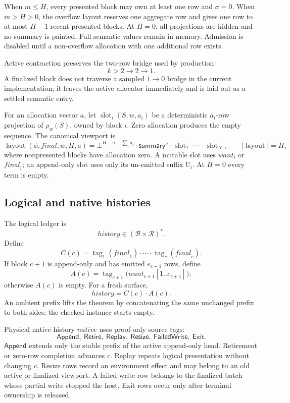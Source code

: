 \documentclass[11pt]{article}
\theoremstyle{definition}
\newcommand{\Rows}{\mathcal{R}}
\newcommand{\Blocks}{\mathcal{B}}
\newcommand{\seq}[1]{#1^{*}}
\newcommand{\len}[1]{\lvert #1\rvert}
\newcommand{\cat}{\mathbin{\cdot}}
\newcommand{\History}{\mathit{history}}
\newcommand{\Native}{\mathit{native}}
\newcommand{\Want}{\mathit{want}}
\newcommand{\Final}{\mathit{final}}
\newcommand{\blank}{\bot}
\begin{document}
When $m\leq H$, every presented block may own at least one row and $\sigma=0$.
When $m>H>0$, the overflow layout reserves one aggregate row and gives one row
to at most $H-1$ recent presented blocks.  At $H=0$, all projections are
hidden and no summary is painted.  Full semantic values remain in memory.
Admission is disabled until a non-overflow allocation with one additional row
exists.

Active contraction preserves the two-row bridge used by production:
\[
  k>2\longrightarrow2\longrightarrow1.
\]
A finalized block does not traverse a sampled $1\to0$ bridge in the current
implementation; it leaves the active allocator immediately and is laid out as
a settled semantic entry.

For an allocation vector $a$, let
$\operatorname{slot}_i(S,w,a_i)$ be a deterministic $a_i$-row projection of
$\rho_w(S)$, owned by block $i$.  Zero allocation produces the empty
sequence.  The canonical viewport is
\[
  \operatorname{layout}(\phi,\Final,w,H,a)
  =\blank^{H-\sigma-\sum_i a_i}
   \cat\mathsf{summary}^{\sigma}
   \cat\operatorname{slot}_1\cat\cdots\cat\operatorname{slot}_N,
  \qquad \len{\operatorname{layout}}=H,
\]
where nonpresented blocks have allocation zero.  A mutable slot uses $\Want_i$
or $\Final_i$; an append-only slot uses only its un-emitted suffix $U_i$.  At $H=0$ every
term is empty.

\subsection{Logical and native histories}

The logical ledger is
\[
  \History\in\seq{(\Blocks\times\Rows)}.
\]
Define
\[
  C(c)=\operatorname{tag}_1(\Final_1)\cat\cdots\cat
       \operatorname{tag}_c(\Final_c).
\]
If block $c+1$ is append-only and has emitted $e_{c+1}$ rows, define
\[
  A(c)=\operatorname{tag}_{c+1}
       \bigl(\Want_{c+1}[1..e_{c+1}]\bigr);
\]
otherwise $A(c)$ is empty.  For a fresh surface,
\begin{equation}
  \History=C(c)\cat A(c).
  \label{eq:logical-history}
\end{equation}
An ambient prefix lifts the theorem by concatenating the same unchanged prefix
to both sides; the checked instance starts empty.

Physical native history $\Native$ uses proof-only source tags:
\[
  \mathsf{Append},\ \mathsf{Retire},\ \mathsf{Replay},\ \mathsf{Resize},\
  \mathsf{FailedWrite},\ \mathsf{Exit}.
\]
$\mathsf{Append}$ extends only the stable prefix of the active append-only head.
Retirement or zero-row completion advances $c$.  Replay repeats logical
presentation without changing $c$.  Resize rows record an environment effect and may belong
to an old active or finalized viewport.  A failed-write row belongs to the
finalized batch whose partial write stopped the host.  Exit rows occur only
after terminal ownership is released.
\end{document}
